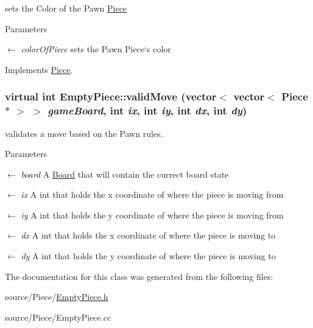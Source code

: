 sets the Color of the Pawn \hyperlink{classPiece}{Piece} 
\begin{DoxyParams}{Parameters}
\item[\mbox{$\leftarrow$} {\em colorOfPiece}]sets the Pawn Piece`s color \end{DoxyParams}


Implements \hyperlink{classPiece_a1387cb503dca308ac1e3bbe38a70a073}{Piece}.\hypertarget{classEmptyPiece_a198d7e2fd83b5564a569f580b6ccd69f}{
\subsubsection[{validMove}]{\setlength{\rightskip}{0pt plus 5cm}virtual int EmptyPiece::validMove (vector$<$ vector$<$ {\bf Piece} $\ast$ $>$ $>$ {\em gameBoard}, \/  int {\em ix}, \/  int {\em iy}, \/  int {\em dx}, \/  int {\em dy})}}
\label{classEmptyPiece_a198d7e2fd83b5564a569f580b6ccd69f}


validates a move based on the Pawn rules. 
\begin{DoxyParams}{Parameters}
\item[\mbox{$\leftarrow$} {\em board}]A \hyperlink{classBoard}{Board} that will contain the currect board state \item[\mbox{$\leftarrow$} {\em ix}]A int that holds the x coordinate of where the piece is moving from \item[\mbox{$\leftarrow$} {\em iy}]A int that holds the y coordinate of where the piece is moving from \item[\mbox{$\leftarrow$} {\em dx}]A int that holds the x coordinate of where the piece is moving to \item[\mbox{$\leftarrow$} {\em dy}]A int that holds the y coordinate of where the piece is moving to \end{DoxyParams}


The documentation for this class was generated from the following files:\begin{DoxyCompactItemize}
\item 
source/Piece/\hyperlink{EmptyPiece_8h}{EmptyPiece.h}\item 
source/Piece/EmptyPiece.cc\end{DoxyCompactItemize}
